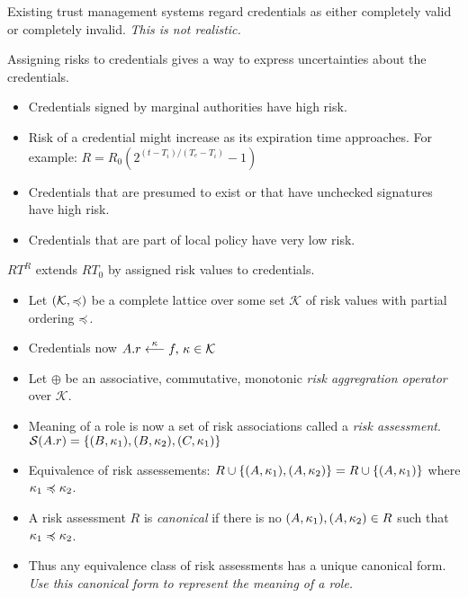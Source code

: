 \documentclass[landscape]{slides}
\begin{document}
Existing trust management systems regard credentials as either completely valid or completely invalid. \textit{This is not realistic.}
\stopslide



Assigning risks to credentials gives a way to express uncertainties about the credentials.

\begin{itemize}
\item Credentials signed by marginal authorities have high risk.
\item Risk of a credential might increase as its expiration time approaches. For example: $R = R_0(2^{(t - T_i)/(T_e - T_i)} - 1)$
\item Credentials that are presumed to exist or that have unchecked signatures have high risk.
\item Credentials that are part of local policy have very low risk.
\end{itemize}

\stopslide



$RT^R$ extends $RT_0$ by assigned risk values to credentials.

\begin{itemize}
\item Let $(\mathcal{K}, \preccurlyeq)$ be a complete lattice over some set $\mathcal{K}$ of risk values with partial ordering $\preccurlyeq$.
\item Credentials now $A.r \stackrel{\kappa}{\longleftarrow} f,\,\kappa \in \mathcal{K}$
\item Let $\oplus$ be an associative, commutative, monotonic \textit{risk aggregration operator} over $\mathcal{K}$.
\item Meaning of a role is now a set of risk associations called a \textit{risk assessment}. $\mathcal{S}(A.r) = \{(B, \kappa_1), (B, \kappa_2), (C, \kappa_1)\}$
\end{itemize}

\stopslide



\begin{itemize}
\item Equivalence of risk assessements: $R \cup \{(A, \kappa_1), (A, \kappa_2)\} = R \cup \{(A, \kappa_1)\}$ where $\kappa_1 \preccurlyeq \kappa_2$.
\item A risk assessment $R$ is \textit{canonical} if there is no $(A, \kappa_1), (A, \kappa_2) \in R$ such that $\kappa_1 \preccurlyeq \kappa_2$.
\item Thus any equivalence class of risk assessments has a unique canonical form. \textit{Use this canonical form to represent the meaning of a role.}
\end{itemize}
\end{document}
